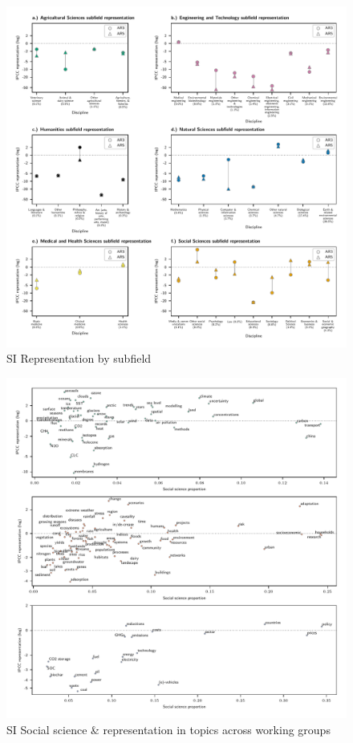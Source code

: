 \documentclass{article}
\begin{document}
\begin{linenumbers}
	\begin{figure}
	\begin{center}
		\includegraphics[width=1\linewidth]{plots_pub/ipcc_rep_wcs_simplified.pdf}
		\caption{SI Representation by subfield}
		\label{subfield}
	\end{center}
\end{figure}

\begin{figure}
	\begin{center}
		\includegraphics[width=1\linewidth]{plots_pub/wgs_socsci.pdf}
		\caption{SI Social science \& representation in topics across working groups}
		\label{socsci-wgs}
	\end{center}
\end{figure}


\end{linenumbers}
\end{document}
